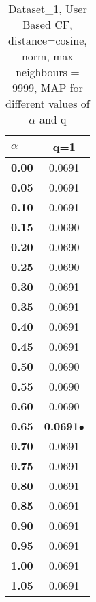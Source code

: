 \begin{table}
\begin{center}
\begin{tabular}{ | l || c |}
\hline
\textbf{$\alpha$} & \textbf{q=1} \\
\hline
\textbf{0.00} & 0.0691\\
\hline
\textbf{0.05} & 0.0691\\
\hline
\textbf{0.10} & 0.0691\\
\hline
\textbf{0.15} & 0.0690\\
\hline
\textbf{0.20} & 0.0690\\
\hline
\textbf{0.25} & 0.0690\\
\hline
\textbf{0.30} & 0.0691\\
\hline
\textbf{0.35} & 0.0691\\
\hline
\textbf{0.40} & 0.0691\\
\hline
\textbf{0.45} & 0.0691\\
\hline
\textbf{0.50} & 0.0690\\
\hline
\textbf{0.55} & 0.0690\\
\hline
\textbf{0.60} & 0.0690\\
\hline
\textbf{0.65} & \textbf{0.0691}$\bullet$\\
\hline
\textbf{0.70} & 0.0691\\
\hline
\textbf{0.75} & 0.0691\\
\hline
\textbf{0.80} & 0.0691\\
\hline
\textbf{0.85} & 0.0691\\
\hline
\textbf{0.90} & 0.0691\\
\hline
\textbf{0.95} & 0.0691\\
\hline
\textbf{1.00} & 0.0691\\
\hline
\textbf{1.05} & 0.0691\\
\hline
\end{tabular}
\caption{Dataset\_1, User Based CF, distance=cosine, norm, max neighbours = 9999, MAP for different values of $\alpha$ and q}
\label{table:MAP_Dataset_1_ucf_cosine_norm_mnn=9999}
\end{center}
\end{table}
